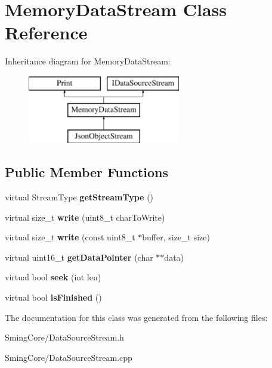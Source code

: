 \hypertarget{class_memory_data_stream}{}\section{Memory\+Data\+Stream Class Reference}
\label{class_memory_data_stream}
Inheritance diagram for Memory\+Data\+Stream\+:\begin{figure}[H]
\begin{center}
\leavevmode
\includegraphics[height=3.000000cm]{class_memory_data_stream}
\end{center}
\end{figure}
\subsection*{Public Member Functions}
\begin{DoxyCompactItemize}
\item 
\hypertarget{class_memory_data_stream_a29d74d448be139ab37649b7170490807}{}virtual Stream\+Type {\bfseries get\+Stream\+Type} ()\label{class_memory_data_stream_a29d74d448be139ab37649b7170490807}

\item 
\hypertarget{class_memory_data_stream_a354c172099a391a98799f5543a1d9976}{}virtual size\+\_\+t {\bfseries write} (uint8\+\_\+t char\+To\+Write)\label{class_memory_data_stream_a354c172099a391a98799f5543a1d9976}

\item 
\hypertarget{class_memory_data_stream_abe83097f3f9edeb5b7712c9c91be65c9}{}virtual size\+\_\+t {\bfseries write} (const uint8\+\_\+t $\ast$buffer, size\+\_\+t size)\label{class_memory_data_stream_abe83097f3f9edeb5b7712c9c91be65c9}

\item 
\hypertarget{class_memory_data_stream_a6453a186b60d014da601f73e1b6b8551}{}virtual uint16\+\_\+t {\bfseries get\+Data\+Pointer} (char $\ast$$\ast$data)\label{class_memory_data_stream_a6453a186b60d014da601f73e1b6b8551}

\item 
\hypertarget{class_memory_data_stream_a0ba5090f3f43b7ba49c2f1f5f744303c}{}virtual bool {\bfseries seek} (int len)\label{class_memory_data_stream_a0ba5090f3f43b7ba49c2f1f5f744303c}

\item 
\hypertarget{class_memory_data_stream_a682a22c988c2131606f22e30bb7263ae}{}virtual bool {\bfseries is\+Finished} ()\label{class_memory_data_stream_a682a22c988c2131606f22e30bb7263ae}

\end{DoxyCompactItemize}


The documentation for this class was generated from the following files\+:\begin{DoxyCompactItemize}
\item 
Sming\+Core/Data\+Source\+Stream.\+h\item 
Sming\+Core/Data\+Source\+Stream.\+cpp\end{DoxyCompactItemize}

